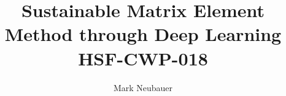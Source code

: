 \usepackage[utf8]{inputenc}
\usepackage[USenglish]{babel}
\usepackage{enumitem}
\usepackage{tikz}
\usepackage{verbatim}
\usepackage{authblk}

\usepackage[a4paper,margin=2cm]{geometry}%

\usepackage{fancyhdr}
\pagestyle{fancy}
\fancyhf{}
\chead{}
\cfoot{\thepage}
\renewcommand{\headrulewidth}{1.0pt}

\title{Sustainable Matrix Element Method through Deep Learning \\ 
\vspace{2mm} 
\large HSF-CWP-018 \\
}

\author[1]{Mark Neubauer}



\renewcommand\Authands{ and }


\usepackage{hyperref}
\hypersetup{
  colorlinks=true,       %
  linkcolor=black,          %
  citecolor=green,        %
  filecolor=magenta,      %
  urlcolor=blue           %
}

\usepackage{amssymb}%
\usepackage{amsmath}
\usepackage{pifont}%
\providecommand{\xmark}{\ding{55}}%

\usepackage[backend=biber,defernumbers=true,sorting=none,firstinits=true,natbib=true,style=numeric-comp]{biblatex}



